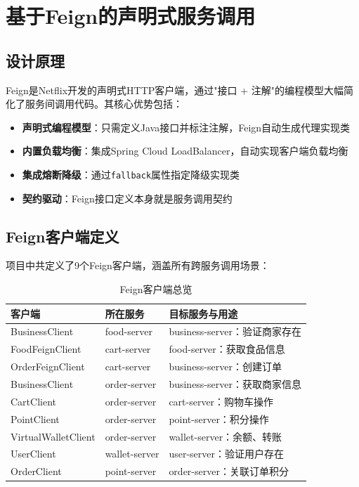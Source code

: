 
\chapter{基于Feign的声明式服务调用}

\section{设计原理}

Feign是Netflix开发的声明式HTTP客户端，通过"接口 + 注解"的编程模型大幅简化了服务间调用代码。其核心优势包括：

\begin{itemize}
	\item \textbf{声明式编程模型}：只需定义Java接口并标注注解，Feign自动生成代理实现类
	\item \textbf{内置负载均衡}：集成Spring Cloud LoadBalancer，自动实现客户端负载均衡
	\item \textbf{集成熔断降级}：通过\verb|fallback|属性指定降级实现类
	\item \textbf{契约驱动}：Feign接口定义本身就是服务调用契约
\end{itemize}

\section{Feign客户端定义}

项目中共定义了9个Feign客户端，涵盖所有跨服务调用场景：

\begin{table}[H]
	\centering
	\caption{Feign客户端总览}
	\begin{tabular}{p{3.5cm}p{3.0cm}p{4.0cm}}
		\hline
		\textbf{客户端} & \textbf{所在服务} & \textbf{目标服务与用途} \\
		\hline
		BusinessClient & food-server & business-server：验证商家存在 \\
		FoodFeignClient & cart-server & food-server：获取食品信息 \\
		OrderFeignClient & cart-server & business-server：创建订单 \\
		BusinessClient & order-server & business-server：获取商家信息 \\
		CartClient & order-server & cart-server：购物车操作 \\
		PointClient & order-server & point-server：积分操作 \\
		VirtualWalletClient & order-server & wallet-server：余额、转账 \\
		UserClient & wallet-server & user-server：验证用户存在 \\
		OrderClient & point-server & order-server：关联订单积分 \\
		\hline
	\end{tabular}
\end{table}

